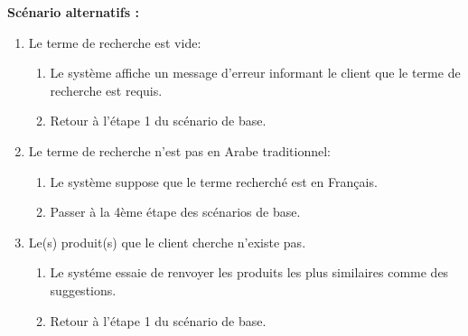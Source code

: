 \newpage
\textbf{Scénario alternatifs : }
\begin{enumerate}
	\item Le terme de recherche est vide:
	      \begin{enumerate}
		      \item Le système affiche un message d'erreur informant le client que le terme de recherche est requis.
		      \item Retour à l'étape 1 du scénario de base.
	      \end{enumerate}
	\item Le terme de recherche n'est pas en Arabe traditionnel:
	      \begin{enumerate}
		      \item Le système suppose que le terme recherché est en Français.
		      \item Passer à la 4ème étape des scénarios de base.
	      \end{enumerate}
	\item Le(s) produit(s) que le client cherche n'existe pas.
	      \begin{enumerate}
		      \item Le systéme essaie de renvoyer les produits les plus similaires comme des suggestions.
		      \item Retour à l'étape 1 du scénario de base.
	      \end{enumerate}
\end{enumerate}

